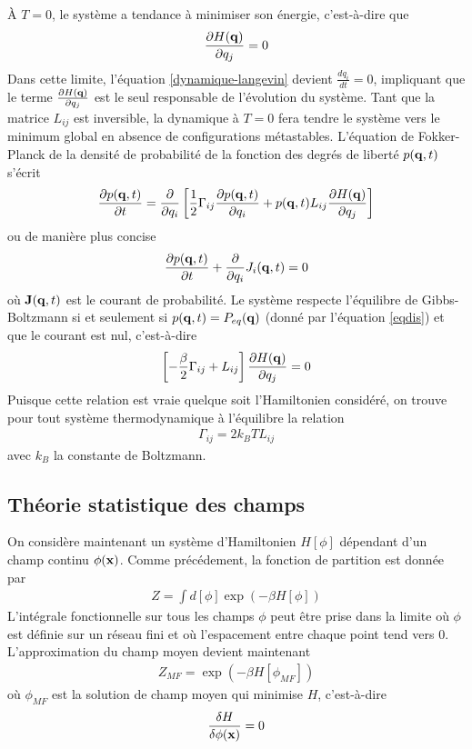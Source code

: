 À $T=0$, le système a tendance à minimiser son énergie, c'est-à-dire que
\begin{align}
    \frac{\partial H({\bf q})}{ \partial q_j} = 0
\end{align}
Dans cette limite, l'équation \ref{dynamique-langevin} devient $\frac{d q_i}{dt}=0$, impliquant que le terme $\frac{\partial H({\bf q})}{ \partial q_j}$ est le seul responsable de l'évolution du système.
Tant que la matrice $L_{ij}$ est inversible, la dynamique à $T=0$ fera tendre le système vers le minimum global en absence de configurations métastables.
L'équation de Fokker-Planck de la densité de probabilité de la fonction des degrés de liberté $p({\bf q},t)$ s'écrit 
\begin{align}
    \frac{\partial p({\bf q},t)}{\partial t} = \frac{\partial}{\partial q_i} \left[\frac{1}{2}\Gamma_{ij}                 \frac{\partial p({\bf q},t)}{\partial q_i} + p({\bf q},t) L_{ij}\frac{\partial H({\bf q})}{ \partial q_j}\right]
\end{align}
ou de manière plus concise
\begin{align}
    \frac{\partial p({\bf q},t)}{\partial t} +\frac{\partial}{\partial q_i}J_i({\bf q},t)=0
    \label{courant}
\end{align}
où  ${\bf J}({\bf q},t)$ est le courant de probabilité. Le système respecte l'équilibre de Gibbs-Boltzmann si et seulement si $p({\bf q},t)=P_{eq}({\bf q})$ (donné par l'équation \ref{eqdis}) et que le courant est nul, c'est-à-dire
\begin{align}
    \left[-\frac{\beta}{2}\Gamma_{ij} + L_{ij}\right]\frac{\partial H({\bf q})}{ \partial q_j} = 0
\end{align}
Puisque cette relation est vraie quelque soit l'Hamiltonien considéré, on trouve pour tout système thermodynamique à l'équilibre la relation
\begin{align}
    \Gamma_{ij}= 2 k_B T L_{ij}
\end{align}
avec $k_B$ la constante de Boltzmann.

    \subsection{Théorie statistique des champs}

On considère maintenant un système d'Hamiltonien $H[\phi]$  dépendant d'un champ continu $\phi({\bf x})$. Comme précédement, la fonction de partition est donnée par 
\begin{align}
    Z = \int d[\phi] \exp(-\beta H[\phi])
\end{align}
L'intégrale fonctionnelle sur tous les champs $\phi$ peut être prise dans la limite où $\phi$ est définie sur un réseau fini et où l'espacement entre chaque point tend vers $0$.
L'approximation du champ moyen devient maintenant
\begin{align}
    Z _{MF}=  \exp(-\beta H[\phi_{MF}])
\end{align} 
où $\phi_{MF}$ est la solution de champ moyen qui minimise $H$, c'est-à-dire 
\begin{align}
    \frac{\delta H}{\delta\phi({\bf x})} = 0
    \label{equi-hamil}
\end{align}

